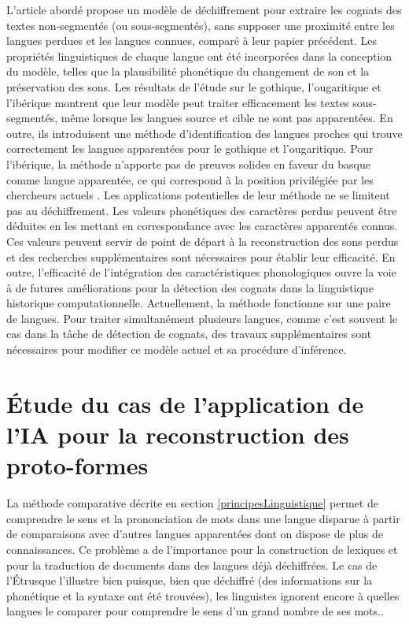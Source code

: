 \documentclass[12pt, french, twoside]{report}
\begin{document}
L'article abordé propose un modèle de déchiffrement pour extraire les cognats des textes non-segmentés (ou sous-segmentés), sans supposer une proximité entre les langues perdues et les langues connues, comparé à leur papier précédent\cite{ugaritic-and-linear-B}. Les propriétés linguistiques de chaque langue ont été incorporées dans la conception du modèle, telles que la plausibilité phonétique du changement de son et la préservation des sons. Les résultats de l'étude sur le gothique, l'ougaritique et l'ibérique montrent que leur modèle peut traiter efficacement les textes sous-segmentés, même lorsque les langues source et cible ne sont pas apparentées. En outre, ils introduisent une méthode d'identification des langues proches qui trouve correctement les langues apparentées pour le gothique et l'ougaritique. Pour l'ibérique, la méthode n'apporte pas de preuves solides en faveur du basque comme langue apparentée, ce qui correspond à la position privilégiée par les chercheurs actuels \cite{deepmind2022}. Les applications potentielles de leur méthode ne se limitent pas au déchiffrement. Les valeurs phonétiques des caractères perdus peuvent être déduites en les mettant en correspondance avec les caractères apparentés connus. Ces valeurs peuvent servir de point de départ à la reconstruction des sons perdus et des recherches supplémentaires sont nécessaires pour établir leur efficacité. En outre, l'efficacité de l'intégration des caractéristiques phonologiques ouvre la voie à de futures améliorations pour la détection des cognats dans la linguistique historique computationnelle. Actuellement, la méthode fonctionne sur une paire de langues. Pour traiter simultanément plusieurs langues, comme c'est souvent le cas dans la tâche de détection de cognats, des travaux supplémentaires sont nécessaires pour modifier ce modèle actuel et sa procédure d'inférence. \\

\chapter{Étude du cas de l'application de l'IA pour la reconstruction des proto-formes}
La méthode comparative décrite en section \ref{principesLinguistique} permet de comprendre le sens et la prononciation de mots dans une langue disparue à partir de comparaisons avec d'autres langues apparentées dont on dispose de plus de connaissances. Ce problème a de l'importance pour la construction de lexiques et pour la traduction de documents dans des langues déjà déchiffrées. Le cas de l'Étrusque l'illustre bien puisque, bien que déchiffré (des informations sur la phonétique et la syntaxe ont été trouvées), les linguistes ignorent encore à quelles langues le comparer pour comprendre le sens d'un grand nombre de ses mots.\cite{bnf_etrusque}.
\end{document}

